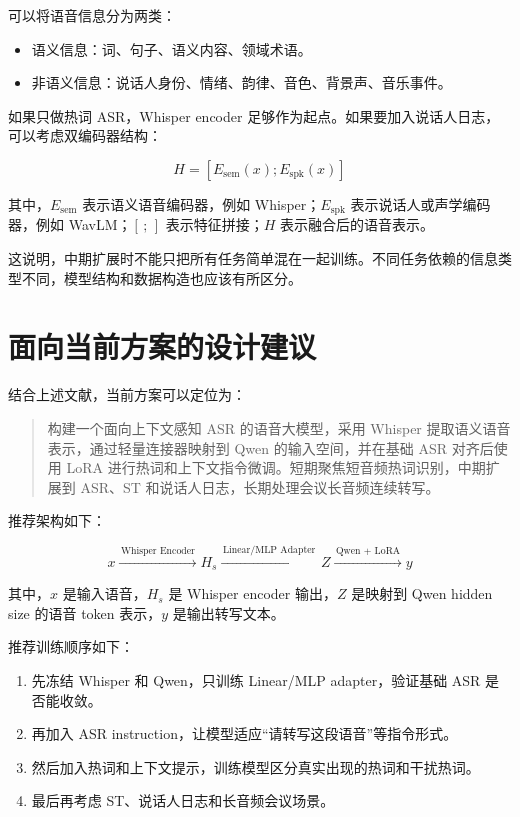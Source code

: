 \documentclass[UTF8,fontset=fandol]{ctexart}
\begin{document}
可以将语音信息分为两类：

\begin{itemize}
  \item 语义信息：词、句子、语义内容、领域术语。
  \item 非语义信息：说话人身份、情绪、韵律、音色、背景声、音乐事件。
\end{itemize}

如果只做热词 ASR，Whisper encoder 足够作为起点。如果要加入说话人日志，可以考虑双编码器结构：

$$
H = [E_{\text{sem}}(x); E_{\text{spk}}(x)]
$$

其中，$E_{\text{sem}}$ 表示语义语音编码器，例如 Whisper；$E_{\text{spk}}$ 表示说话人或声学编码器，例如 WavLM；$[\,;\,]$ 表示特征拼接；$H$ 表示融合后的语音表示。

这说明，中期扩展时不能只把所有任务简单混在一起训练。不同任务依赖的信息类型不同，模型结构和数据构造也应该有所区分。

\section{面向当前方案的设计建议}

结合上述文献，当前方案可以定位为：

\begin{quote}
构建一个面向上下文感知 ASR 的语音大模型，采用 Whisper 提取语义语音表示，通过轻量连接器映射到 Qwen 的输入空间，并在基础 ASR 对齐后使用 LoRA 进行热词和上下文指令微调。短期聚焦短音频热词识别，中期扩展到 ASR、ST 和说话人日志，长期处理会议长音频连续转写。
\end{quote}

推荐架构如下：

$$
x \xrightarrow{\,\text{Whisper Encoder}\,} H_s
\xrightarrow{\,\text{Linear/MLP Adapter}\,} Z
\xrightarrow{\,\text{Qwen + LoRA}\,} y
$$

其中，$x$ 是输入语音，$H_s$ 是 Whisper encoder 输出，$Z$ 是映射到 Qwen hidden size 的语音 token 表示，$y$ 是输出转写文本。

推荐训练顺序如下：

\begin{enumerate}
  \item 先冻结 Whisper 和 Qwen，只训练 Linear/MLP adapter，验证基础 ASR 是否能收敛。
  \item 再加入 ASR instruction，让模型适应``请转写这段语音''等指令形式。
  \item 然后加入热词和上下文提示，训练模型区分真实出现的热词和干扰热词。
  \item 最后再考虑 ST、说话人日志和长音频会议场景。
\end{enumerate}
\end{document}
